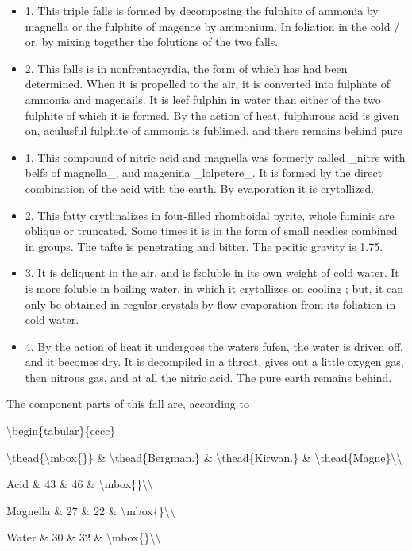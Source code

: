 \documentclass{article}
\begin{document}
\begin{itemize}
\item 1. This triple falls is formed by decomposing the fulphite of ammonia by magnella or the fulphite of magenae by ammonium. In foliation in the cold / or, by mixing together the folutions of the two falls.
\item 2. This falls is in nonfrentacyrdia, the form of which has had been determined. When it is propelled to the air, it is converted into fulphate of ammonia and magenails. It is leef fulphin in water than either of the two fulphite of which it is formed. By the action of heat, fulphurous acid is given on, aculusful fulphite of ammonia is fublimed, and there remains behind pure
\item 1. This compound of nitric acid and magnella was formerly called \_nitre with belfs of magnella\_, and magenina \_lolpetere\_. It is formed by the direct combination of the acid with the earth. By evaporation it is crytallized.
\item 2. This fatty crytlinalizes in four-filled rhomboidal pyrite, whole fuminis are oblique or truncated. Some times it is in the form of small needles combined in groups. The tafte is penetrating and bitter. The pecitic gravity is 1.75.
\item 3. It is deliquent in the air, and is fsoluble in its own weight of cold water. It is more foluble in boiling water, in which it crytallizes on cooling ; but, it can only be obtained in regular crystals by flow evaporation from its foliation in cold water.
\item 4. By the action of heat it undergoes the waters fufen, the water is driven off, and it becomes dry. It is decompiled in a throat, gives out a little oxygen gas, then nitrous gas, and at all the nitric acid. The pure earth remains behind.
\end{itemize}
The component parts of this fall are, according to

\textbackslash{}begin\{tabular\}\{cccc\}

\textbackslash{}thead\{\textbackslash{}mbox\{\}\} \& \textbackslash{}thead\{Bergman.\} \& \textbackslash{}thead\{Kirwan.\} \& \textbackslash{}thead\{Magne\}\textbackslash{}\textbackslash{}

Acid \& 43 \& 46 \& \textbackslash{}mbox\{\}\textbackslash{}\textbackslash{}

Magnella \& 27 \& 22 \& \textbackslash{}mbox\{\}\textbackslash{}\textbackslash{}

Water \& 30 \& 32 \& \textbackslash{}mbox\{\}\textbackslash{}\textbackslash{}
\end{document}
